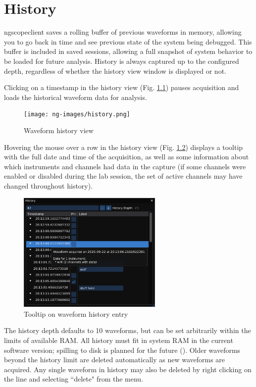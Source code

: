\chapter{History}
\label{sec:history}

ngscopeclient saves a rolling buffer of previous waveforms in memory, allowing you to go back in time and see previous
state of the system being debugged. This buffer is included in saved sessions, allowing a full snapshot of system
behavior to be loaded for future analysis. History is always captured up to the configured depth, regardless of whether
the history view window is displayed or not.

Clicking on a timestamp in the history view (Fig. \ref{historyview}) pauses acquisition and loads the historical
waveform data for analysis.

\begin{figure}[H]
\centering
\texttt{[image: ng-images/history.png]}
\caption{Waveform history view}
\label{historyview}
\end{figure}

Hovering the mouse over a row in the history view (Fig. \ref{history-tooltip}) displays a tooltip with the full date
and time of the acquisition, as well as some information about which instruments and channels had data in the capture
(if some channels were enabled or disabled during the lab session, the set of active channels may have changed
throughout history).

\begin{figure}[H]
\centering
\includegraphics[width=7cm]{ng-images/history-tooltip.png}
\caption{Tooltip on waveform history entry}
\label{history-tooltip}
\end{figure}

The history depth defaults to 10 waveforms, but can be set arbitrarily within the limits of available RAM. All history
must fit in system RAM in the current software version; spilling to disk is planned for the future
(). Older waveforms beyond the history limit are deleted automatically as new waveforms are
acquired. Any single waveform in history may also be deleted by right clicking on the line and selecting ``delete" from
the menu.

